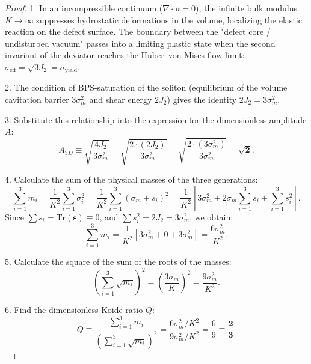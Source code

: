 \documentclass[12pt,a4paper]{article}
\begin{document}
	\begin{proof}
	1. In an incompressible continuum ($\nabla \cdot \mathbf{u} = 0$), the infinite bulk modulus $K \to \infty$ suppresses hydrostatic deformations in the volume, localizing the elastic reaction on the defect surface. The boundary between the "defect core / undisturbed vacuum" passes into a limiting plastic state when the second invariant of the deviator reaches the Huber--von Mises flow limit: $\sigma_{\text{eff}} = \sqrt{3 J_2} = \sigma_{\text{yield}}$.
		
	2. The condition of BPS-saturation of the soliton (equilibrium of the volume cavitation barrier $3\sigma_m^2$ and shear energy $2J_2$) gives the identity $2 J_2 = 3 \sigma_m^2$.
		
	3. Substitute this relationship into the expression for the dimensionless amplitude $A$:
	\begin{equation}
	A_{3D} \equiv \sqrt{\frac{4 J_2}{3 \sigma_m^2}} = \sqrt{\frac{2 \cdot (2 J_2)}{3 \sigma_m^2}} = \sqrt{\frac{2 \cdot (3 \sigma_m^2)}{3 \sigma_m^2}} = \mathbf{\sqrt{2}}.
	\end{equation}
		
	4. Calculate the sum of the physical masses of the three generations:
	\begin{equation}
	\sum_{i=1}^3 m_i = \frac{1}{K^2} \sum_{i=1}^3 \sigma_i^2 = \frac{1}{K^2} \sum_{i=1}^3 (\sigma_m + s_i)^2 = \frac{1}{K^2} \left[ 3 \sigma_m^2 + 2\sigma_m \sum_{i=1}^3 s_i + \sum_{i=1}^3 s_i^2 \right].
	\end{equation}
	Since $\sum s_i = \mathrm{Tr}(\mathbf{s}) \equiv 0$, and $\sum s_i^2 = 2 J_2 = 3 \sigma_m^2$, we obtain:
	\begin{equation}
	\sum_{i=1}^3 m_i = \frac{1}{K^2} \left[ 3 \sigma_m^2 + 0 + 3 \sigma_m^2 \right] = \frac{6 \sigma_m^2}{K^2}.
	\end{equation}
		
	5. Calculate the square of the sum of the roots of the masses:
	\begin{equation}
	\left( \sum_{i=1}^3 \sqrt{m_i} \right)^2 = \left( \frac{3 \sigma_m}{K} \right)^2 = \frac{9 \sigma_m^2}{K^2}.
	\end{equation}
		
	6. Find the dimensionless Koide ratio $Q$:
	\begin{equation}
	Q \equiv \frac{\sum_{i=1}^3 m_i}{\left( \sum_{i=1}^3 \sqrt{m_i} \right)^2} = \frac{6 \sigma_m^2 / K^2}{9 \sigma_m^2 / K^2} = \frac{6}{9} \equiv \mathbf{\frac{2}{3}}.
	\end{equation}
	\end{proof}
	
\end{document}
